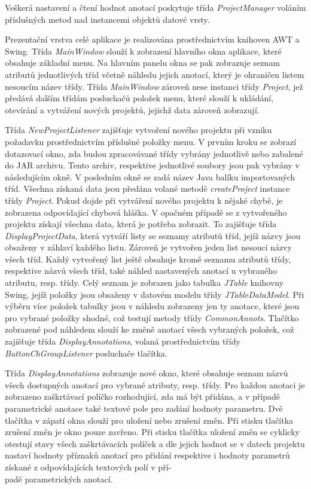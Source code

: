 \documentclass{projekt}
\begin{document}
Veškerá nastavení a čtení hodnot anotací poskytuje třída {\it ProjectManager} voláním příslušných metod nad instancemi objektů datové vrsty.


Prezentační vrstva celé aplikace je realizována prostřednictvím knihoven AWT a Swing. 
Třída {\it MainWindow} slouží k zobrazení hlavního okna aplikace, které obsahuje základní menu. Na hlavním panelu okna se pak zobrazuje seznam atributů jednotlivých tříd včetně náhledu jejich anotací, který je ohraničen listem nesoucím název třídy. Třída {\it MainWindow} zároveň nese instanci třídy {\it Project}, jež předává dalším třídám posluchačů položek menu, které slouží k ukládání, otevírání a vytváření nových projektů, jejichž data zároveň zobrazují.


Třída {\it NewProjectListener} zajišťuje vytvoření nového projektu při vzniku požadavku prostřednictvím příslušné položky menu. V prvním kroku se zobrazí dotazovací okno, zda budou zpracovávané třídy vybrány jednotlivě nebo zabalené do JAR archivu. Tento archiv, respektive jednotlivé soubory jsou pak vybrány v následujícím okně. V posledním okně se zadá název Java balíku importovaných tříd. Všechna získaná data jsou předána volané metodě {\it createProject} instance třídy {\it Project}. Pokud dojde při vytváření nového projektu k nějaké chybě, je zobrazena odpovídající chybová hláška. V opačném případě se z vytvořeného projektu získají všechna data, která je potřeba zobrazit. To zajišťuje třída {\it DisplayProjectData}, která vytváří listy se seznamy atributů tříd, jejíž názvy jsou obsaženy v záhlaví každého listu. Zároveň je vytvořen jeden list nesoucí názvy všech tříd. Každý vytvořený list ještě obsahuje kromě seznamu atributů třídy, respektive názvů všech tříd, také náhled nastavených anotací u vybraného atributu, resp. třídy. Celý seznam je zobrazen jako tabulka {\it JTable} knihovny Swing, jejíž položky jsou obsaženy v datovém modelu třídy {\it JTableDataModel}. Při výběru více položek tabulky jsou v náhledu zobrazeny jen ty anotace, které jsou pro vybrané položky shodné, což testují metody třídy {\it CommonAnnots}. Tlačítko zobrazené pod náhledem slouží ke změně anotací všech vybraných položek, což zajišťuje třída {\it DisplayAnnotations}, volaná prostřednictvím třídy {\it ButtonChGroupListener} posluchače tlačítka.


Třída {\it DisplayAnnotations} zobrazuje nové okno, které obsahuje seznam názvů všech dostupných anotací pro vybrané atributy, resp. třídy. Pro každou anotaci je zobrazeno zaškrtávací políčko rozhodující, zda má být přidána, a v případě parametrické anotace také textové pole pro zadání hodnoty parametru. Dvě tlačítka v zápatí okna slouží pro uložení nebo zrušení změn. Při stisku tlačítka zrušení změn je okno pouze zavřeno. Při stisku tlačítka uložení změn se cyklicky otestují stavy všech zaškrtávacích políček a dle jejich hodnot se v datech projektu nastaví hodnoty příznaků anotací pro přidání respektive i hodnoty parametrů získané z odpovídajících textových polí v pří-\\padě parametrických anotací.
\end{document}
